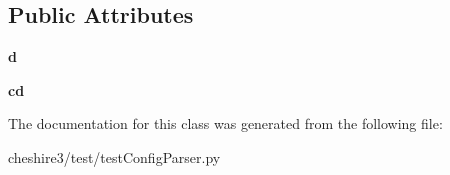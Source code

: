 \subsection*{Public Attributes}
\begin{DoxyCompactItemize}
\item 
\hypertarget{classcheshire3_1_1test_1_1test_config_parser_1_1_caseless_dictionary_test_case_abc5bacf98b5a4ad03ad46fb558001a5e}{{\bfseries d}}\label{classcheshire3_1_1test_1_1test_config_parser_1_1_caseless_dictionary_test_case_abc5bacf98b5a4ad03ad46fb558001a5e}

\item 
\hypertarget{classcheshire3_1_1test_1_1test_config_parser_1_1_caseless_dictionary_test_case_ad666a0fc7f9944336c458c15c2aa5df5}{{\bfseries cd}}\label{classcheshire3_1_1test_1_1test_config_parser_1_1_caseless_dictionary_test_case_ad666a0fc7f9944336c458c15c2aa5df5}

\end{DoxyCompactItemize}


The documentation for this class was generated from the following file\-:\begin{DoxyCompactItemize}
\item 
cheshire3/test/test\-Config\-Parser.\-py\end{DoxyCompactItemize}
